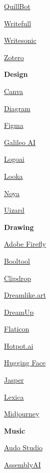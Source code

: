 \documentclass[
]{book}
\begin{document}
\href{https://quillbot.com/}{QuillBot}

\href{https://www.writefull.com/}{Writefull}

\href{https://writesonic.com/}{Writesonic}

\href{https://www.zotero.org/}{Zotero}

\textbf{Design}

\href{https://www.canva.com/templates/}{Canva}

\href{https://diagram.com/}{Diagram}

\href{https://www.figma.com/}{Figma}

\href{https://www.usegalileo.ai/explore}{Galileo AI}

\href{https://www.logoai.com/logo-maker}{Logoai}

\href{https://looka.com/}{Looka}

\href{https://www.noya.io/ui}{Noya}

\href{https://uizard.io/templates/}{Uizard}

\textbf{Drawing}

\href{https://www.adobe.com/products/firefly.html?gclid=Cj0KCQjwk6SwBhDPARIsAJ59Gwd5ryWm7_kkdRXLvJCASelBPtk88u8PidKCH0UEBeuP_89Y1cbLY6gaAnLmEALw_wcB\&sdid=JM4FW6VL\&mv=search\&mv2=paidsearch\&ef_id=Cj0KCQjwk6SwBhDPARIsAJ59Gwd5ryWm7_kkdRXLvJCASelBPtk88u8PidKCH0UEBeuP_89Y1cbLY6gaAnLmEALw_wcB:G:s\&s_kwcid=AL!3085!3!677394754238!e!!g!!adobe\%20firefly!19870733758!148140507838\&gad_source=1}{Adobe Firefly}

\href{https://booltool.boolv.tech/home}{Booltool}

\href{https://clipdrop.co/}{Clipdrop}

\href{https://dreamlike.art/}{Dreamlike.art}

\href{https://www.dreamup.com/}{DreamUp}

\href{https://www.flaticon.com/}{Flaticon}

\href{https://hotpot.ai/}{Hotpot.ai}

\href{https://huggingface.co/spaces/stabilityai/stable-diffusion}{Hugging Face}

\href{https://www.jasper.ai/}{Jasper}

\href{https://lexica.art/}{Lexica}

\href{https://www.midjourney.com/home}{Midjourney}

\textbf{Music}

\href{https://audo.ai/}{Audo Studio}

\href{https://www.assemblyai.com/}{AssemblyAI}
\end{document}
